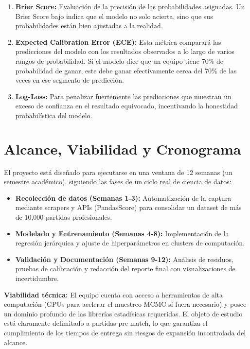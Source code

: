 \documentclass[12pt,a4paper]{article}
\begin{document}
\begin{enumerate}
    \item \textbf{Brier Score:} Evaluación de la precisión de las probabilidades asignadas. Un Brier Score bajo indica que el modelo no solo acierta, sino que sus probabilidades están bien ajustadas a la realidad.
    \item \textbf{Expected Calibration Error (ECE):} Esta métrica comparará las predicciones del modelo con los resultados observados a lo largo de varios rangos de probabilidad. Si el modelo dice que un equipo tiene 70\% de probabilidad de ganar, este debe ganar efectivamente cerca del 70\% de las veces en ese segmento de predicción.
    \item \textbf{Log-Loss:} Para penalizar fuertemente las predicciones que muestran un exceso de confianza en el resultado equivocado, incentivando la honestidad probabilística del modelo.
\end{enumerate}

\section{Alcance, Viabilidad y Cronograma}

El proyecto está diseñado para ejecutarse en una ventana de 12 semanas (un semestre académico), siguiendo las fases de un ciclo real de ciencia de datos:

\begin{itemize}
    \item \textbf{Recolección de datos (Semanas 1-3):} Automatización de la captura mediante scrapers y APIs (PandasScore) para consolidar un dataset de más de 10,000 partidas profesionales.
    \item \textbf{Modelado y Entrenamiento (Semanas 4-8):} Implementación de la regresión jerárquica y ajuste de hiperparámetros en clusters de computación.
    \item \textbf{Validación y Documentación (Semanas 9-12):} Análisis de residuos, pruebas de calibración y redacción del reporte final con visualizaciones de incertidumbre.
\end{itemize}

\textbf{Viabilidad técnica:} El equipo cuenta con acceso a herramientas de alta computación (GPUs para acelerar el muestreo MCMC si fuera necesario) y posee un dominio profundo de las librerías estadísicas requeridas. El objeto de estudio está claramente delimitado a partidas pre-match, lo que garantiza el cumplimiento de los tiempos de entrega sin riesgos de expansión incontrolada del alcance.
\end{document}
